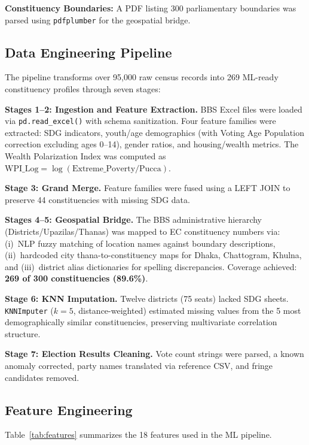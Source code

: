 \documentclass[conference]{IEEEtran}
\begin{document}
\textbf{Constituency Boundaries:} A PDF listing 300 parliamentary boundaries was parsed using \texttt{pdfplumber} for the geospatial bridge.

\subsection{Data Engineering Pipeline}

The pipeline transforms over 95,000 raw census records into 269 ML-ready constituency profiles through seven stages:

\textbf{Stages 1--2: Ingestion and Feature Extraction.} BBS Excel files were loaded via \texttt{pd.read\_excel()} with schema sanitization. Four feature families were extracted: SDG indicators, youth/age demographics (with Voting Age Population correction excluding ages 0--14), gender ratios, and housing/wealth metrics. The Wealth Polarization Index was computed as $\text{WPI\_Log} = \log(\text{Extreme\_Poverty} / \text{Pucca})$.

\textbf{Stage 3: Grand Merge.} Feature families were fused using a LEFT JOIN to preserve 44 constituencies with missing SDG data.

\textbf{Stages 4--5: Geospatial Bridge.} The BBS administrative hierarchy (Districts/Upazilas/Thanas) was mapped to EC constituency numbers via: (i)~NLP fuzzy matching of location names against boundary descriptions, (ii)~hardcoded city thana-to-constituency maps for Dhaka, Chattogram, Khulna, and (iii)~district alias dictionaries for spelling discrepancies. Coverage achieved: \textbf{269 of 300 constituencies (89.6\%)}.

\textbf{Stage 6: KNN Imputation.} Twelve districts (75 seats) lacked SDG sheets. \texttt{KNNImputer} ($k=5$, distance-weighted) estimated missing values from the 5 most demographically similar constituencies, preserving multivariate correlation structure.

\textbf{Stage 7: Election Results Cleaning.} Vote count strings were parsed, a known anomaly corrected, party names translated via reference CSV, and fringe candidates removed.

\subsection{Feature Engineering}

Table~\ref{tab:features} summarizes the 18 features used in the ML pipeline.
\end{document}
